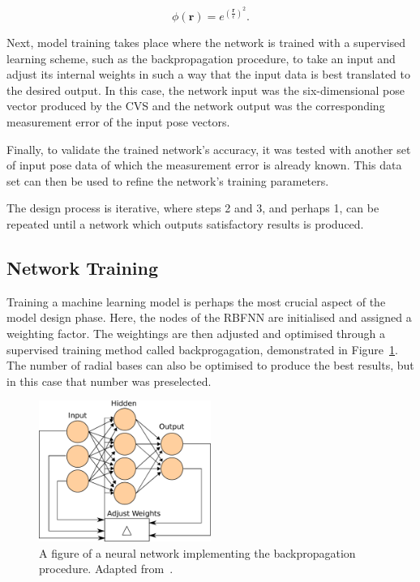 \begin{equation}
  \phi(\bm{r}) = e^{(\frac{\bm{r}}{\epsilon})^2}.
\end{equation}

Next, model training takes place where the network is trained with a supervised learning scheme, such as the backpropagation procedure, to take an input and adjust its internal weights in such a way that the input data is best translated to the desired output. In this case, the network input was the six-dimensional pose vector produced by the CVS and the network output was the corresponding measurement error of the input pose vectors.  

Finally, to validate the trained network's accuracy, it was tested with another set of input pose data of which the measurement error is already known. This data set can then be used to refine the network's training parameters. 

The design process is iterative, where steps 2 and 3, and perhaps 1, can be repeated until a network which outputs satisfactory results is produced. 

\subsection{Network Training}

Training a machine learning model is perhaps the most crucial aspect of the model design phase. Here, the nodes of the RBFNN are initialised and assigned a weighting factor. The weightings are then adjusted and optimised through a supervised training method called backprogagation, demonstrated in Figure~\ref{fig:chap4-backprogagation}. The number of radial bases can also be optimised to produce the best results, but in this case that number was preselected. 

\begin{figure}
  \centering
  \includegraphics[width=0.5\textwidth]{figures/chapter4/backpropagation}
  \caption[Neural network implementing the backpropagation procedure.]{A figure of a neural network implementing the backpropagation procedure. Adapted from~\cite{ann-wiki-pic}.}
\label{fig:chap4-backprogagation}
\end{figure}

